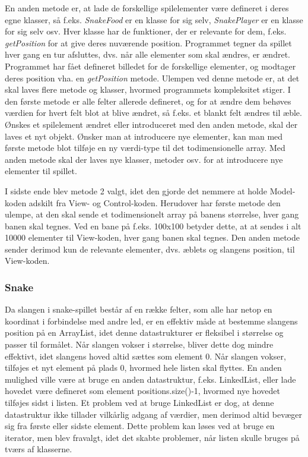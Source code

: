 En anden metode er, at lade de forskellige spilelementer være defineret i deres egne klasser, så f.eks. \textit{SnakeFood} er en klasse for sig selv, \textit{SnakePlayer} er en klasse for sig selv osv. Hver klasse har de funktioner, der er relevante for dem, f.eks. \textit{getPosition} for at give deres nuværende position. Programmet tegner da spillet hver gang en tur afsluttes, dvs. når alle elementer som skal ændres, er ændret. Programmet har fået defineret billedet for de forskellige elementer, og modtager deres position vha. en \textit{getPosition} metode.
Ulempen ved denne metode er, at det skal laves flere metode og klasser, hvormed programmets kompleksitet stiger. I den første metode er alle felter allerede defineret, og for at ændre dem behøves værdien for hvert felt blot at blive ændret, så f.eks. et blankt felt ændres til æble. Ønskes et spilelement ændret eller introduceret med den anden metode, skal der laves et nyt objekt. Ønsker man at introducere nye elementer, kan man med første metode blot tilføje en ny værdi-type til det todimensionelle array. Med anden metode skal der laves nye klasser, metoder osv. for at introducere nye elementer til spillet.
 
I sidste ende blev metode 2 valgt, idet den gjorde det nemmere at holde Model-koden adskilt fra View- og Control-koden. Herudover har første metode den ulempe, at den skal sende et todimensionelt array på banens størrelse, hver gang banen skal tegnes. Ved en bane på f.eks. 100x100 betyder dette, at at sendes i alt 10000 elementer til View-koden, hver gang banen skal tegnes. Den anden metode sender derimod kun de relevante elementer, dvs. æblets og slangens position, til View-koden.

\subsubsection{Snake}
Da slangen i snake-spillet består af en række felter, som alle har netop en koordinat i forbindelse med andre led, er en effektiv måde at bestemme slangens position på en ArrayList, idet denne datastrukturer er fleksibel i størrelse og passer til formålet. Når slangen vokser i størrelse, bliver dette dog mindre effektivt, idet slangens hoved altid sættes som element 0. Når slangen vokser, tilføjes et nyt element på plads 0, hvormed hele listen skal flyttes. En anden mulighed ville være at bruge en anden datastruktur, f.eks. LinkedList, eller lade hovedet være defineret som element positions.size()-1, hvormed nye hovedet tilføjes sidst i listen. Et problem ved at bruge LinkedList er dog, at denne datastruktur ikke tillader vilkårlig adgang af værdier, men derimod altid bevæger sig fra første eller sidste element. Dette problem kan løses ved at bruge en iterator, men blev fravalgt, idet det skabte problemer, når listen skulle bruges på tværs af klasserne.


